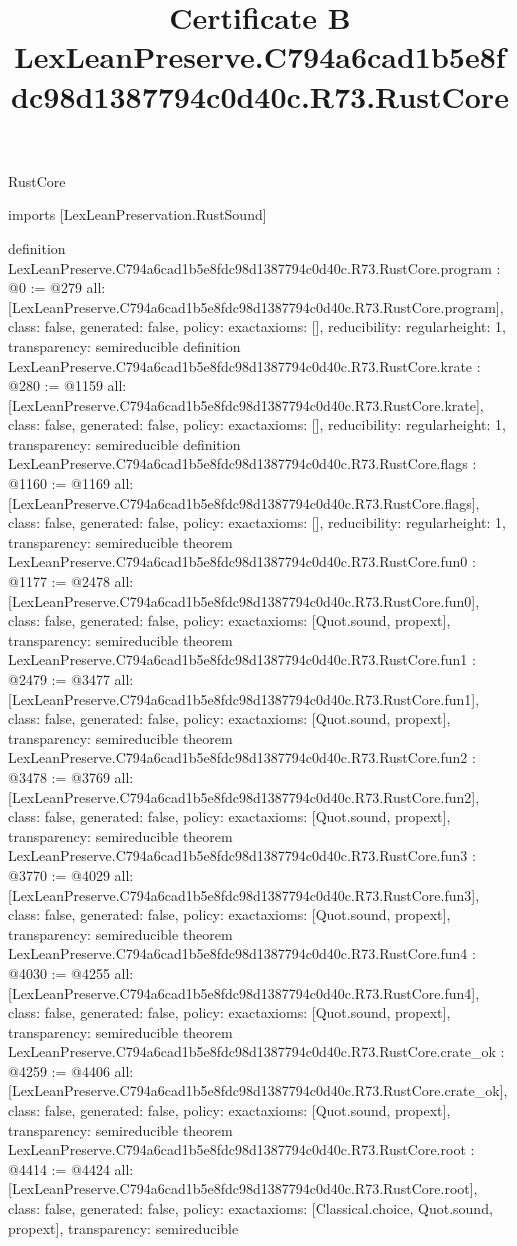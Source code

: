 \begin{lexlean}{RustCore}
\title{Certificate B LexLeanPreserve.C794a6cad1b5e8fdc98d1387794c0d40c.R73.RustCore}
\begin{coremodule}
imports [LexLeanPreservation.RustSound]

definition LexLeanPreserve.C794a6cad1b5e8fdc98d1387794c0d40c.R73.RustCore.program : @0 := @279 {
  all: [LexLeanPreserve.C794a6cad1b5e8fdc98d1387794c0d40c.R73.RustCore.program],
  class: false,
  generated: false,
  policy: exact{axioms: []},
  reducibility: regular{height: 1},
  transparency: semireducible
}
definition LexLeanPreserve.C794a6cad1b5e8fdc98d1387794c0d40c.R73.RustCore.krate : @280 := @1159 {
  all: [LexLeanPreserve.C794a6cad1b5e8fdc98d1387794c0d40c.R73.RustCore.krate],
  class: false,
  generated: false,
  policy: exact{axioms: []},
  reducibility: regular{height: 1},
  transparency: semireducible
}
definition LexLeanPreserve.C794a6cad1b5e8fdc98d1387794c0d40c.R73.RustCore.flags : @1160 := @1169 {
  all: [LexLeanPreserve.C794a6cad1b5e8fdc98d1387794c0d40c.R73.RustCore.flags],
  class: false,
  generated: false,
  policy: exact{axioms: []},
  reducibility: regular{height: 1},
  transparency: semireducible
}
theorem LexLeanPreserve.C794a6cad1b5e8fdc98d1387794c0d40c.R73.RustCore.fun0 : @1177 := @2478 {
  all: [LexLeanPreserve.C794a6cad1b5e8fdc98d1387794c0d40c.R73.RustCore.fun0],
  class: false,
  generated: false,
  policy: exact{axioms: [Quot.sound, propext]},
  transparency: semireducible
}
theorem LexLeanPreserve.C794a6cad1b5e8fdc98d1387794c0d40c.R73.RustCore.fun1 : @2479 := @3477 {
  all: [LexLeanPreserve.C794a6cad1b5e8fdc98d1387794c0d40c.R73.RustCore.fun1],
  class: false,
  generated: false,
  policy: exact{axioms: [Quot.sound, propext]},
  transparency: semireducible
}
theorem LexLeanPreserve.C794a6cad1b5e8fdc98d1387794c0d40c.R73.RustCore.fun2 : @3478 := @3769 {
  all: [LexLeanPreserve.C794a6cad1b5e8fdc98d1387794c0d40c.R73.RustCore.fun2],
  class: false,
  generated: false,
  policy: exact{axioms: [Quot.sound, propext]},
  transparency: semireducible
}
theorem LexLeanPreserve.C794a6cad1b5e8fdc98d1387794c0d40c.R73.RustCore.fun3 : @3770 := @4029 {
  all: [LexLeanPreserve.C794a6cad1b5e8fdc98d1387794c0d40c.R73.RustCore.fun3],
  class: false,
  generated: false,
  policy: exact{axioms: [Quot.sound, propext]},
  transparency: semireducible
}
theorem LexLeanPreserve.C794a6cad1b5e8fdc98d1387794c0d40c.R73.RustCore.fun4 : @4030 := @4255 {
  all: [LexLeanPreserve.C794a6cad1b5e8fdc98d1387794c0d40c.R73.RustCore.fun4],
  class: false,
  generated: false,
  policy: exact{axioms: [Quot.sound, propext]},
  transparency: semireducible
}
theorem LexLeanPreserve.C794a6cad1b5e8fdc98d1387794c0d40c.R73.RustCore.crate_ok : @4259 := @4406 {
  all: [LexLeanPreserve.C794a6cad1b5e8fdc98d1387794c0d40c.R73.RustCore.crate_ok],
  class: false,
  generated: false,
  policy: exact{axioms: [Quot.sound, propext]},
  transparency: semireducible
}
theorem LexLeanPreserve.C794a6cad1b5e8fdc98d1387794c0d40c.R73.RustCore.root : @4414 := @4424 {
  all: [LexLeanPreserve.C794a6cad1b5e8fdc98d1387794c0d40c.R73.RustCore.root],
  class: false,
  generated: false,
  policy: exact{axioms: [Classical.choice, Quot.sound, propext]},
  transparency: semireducible
}


\end{coremodule}
\end{lexlean}
